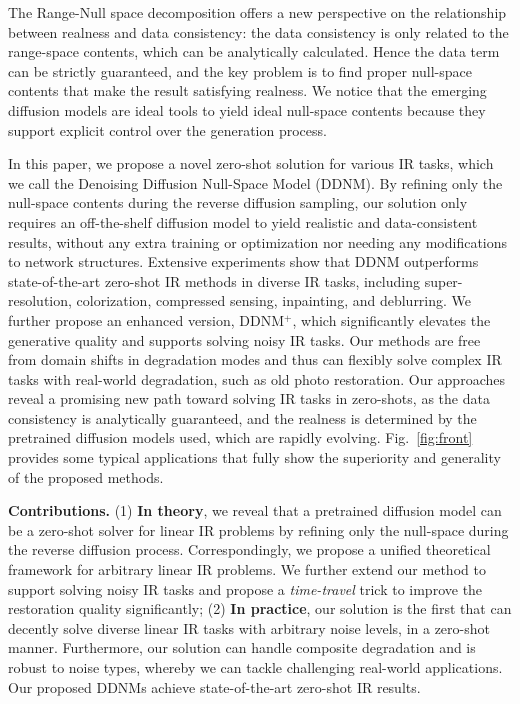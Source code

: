 \documentclass{article} \usepackage{iclr2023_conference,times}
\begin{document}
The Range-Null space decomposition \citep{schwab2019deep,wang2022gan} offers a new perspective on the relationship between realness and data consistency: the data consistency is only related to the range-space contents, which can be analytically calculated. Hence the data term can be strictly guaranteed, and the key problem is to find proper null-space contents that make the result satisfying realness. We notice that the emerging diffusion models \citep{ho2020denoising,dhariwal2021diffusion} are ideal tools to yield ideal null-space contents because they support explicit control over the generation process.  

In this paper, we propose a novel zero-shot solution for various IR tasks, which we call the Denoising Diffusion Null-Space Model (DDNM). By refining only the null-space contents during the reverse diffusion sampling, our solution only requires an off-the-shelf diffusion model to yield realistic and data-consistent results, without any extra training or optimization nor needing any modifications to network structures. Extensive experiments show that DDNM outperforms state-of-the-art zero-shot IR methods in diverse IR tasks, including super-resolution, colorization, compressed sensing, inpainting, and deblurring. We further propose an enhanced version, DDNM$^+$, which significantly elevates the generative quality and supports solving noisy IR tasks. Our methods are free from domain shifts in degradation modes and thus can flexibly solve complex IR tasks with real-world degradation, such as old photo restoration. Our approaches reveal a promising new path toward solving IR tasks in zero-shots, as the data consistency is analytically guaranteed, and the realness is determined by the pretrained diffusion models used, which are rapidly evolving. Fig.~\ref{fig:front} provides some typical applications that fully show the superiority and generality of the proposed methods.

\textbf{Contributions.} (1) \textbf{In theory}, we reveal that a pretrained diffusion model can be a zero-shot solver for linear IR problems by refining only the null-space during the reverse diffusion process. Correspondingly, we propose a unified theoretical framework for arbitrary linear IR problems. We further extend our method to support solving noisy IR tasks and propose a \textit{time-travel} trick to improve the restoration quality significantly; (2) \textbf{In practice}, our solution is the first that can decently solve diverse linear IR tasks with arbitrary noise levels, in a zero-shot manner. Furthermore, our solution can handle composite degradation and is robust to noise types, whereby we can tackle challenging real-world applications. Our proposed DDNMs achieve state-of-the-art zero-shot IR results. 
\end{document}
